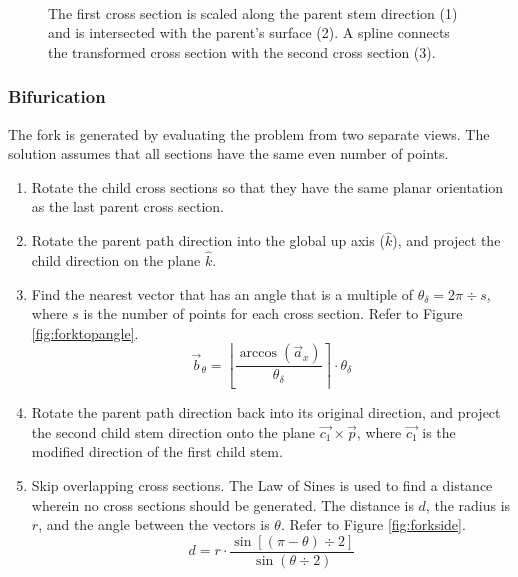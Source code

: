 \documentclass[10pt]{article}
\begin{document}
\begin{figure}[H]
\centering
 \\
\caption{The first cross section is scaled along the parent stem direction (1) and is intersected with the parent's surface (2). A spline connects the transformed cross section with the second cross section (3).}
\end{figure}

\subsubsection{Bifurication}

The fork is generated by evaluating the problem from two separate views. The solution assumes that all sections have the same even number of points.

\begin{enumerate}
\item Rotate the child cross sections so that they have the same planar orientation as the last parent cross section.
\item Rotate the parent path direction into the global up axis ($ \hat{k} $), and project the child direction on the plane $ \hat{k} $.
\item Find the nearest vector that has an angle that is a multiple of $ \theta_{\delta} = 2 \pi \div s $, where $ s $ is the number of points for each cross section. Refer to Figure \ref{fig:forktopangle}.
\[ \vec{b}_{\theta} = \left \lfloor \frac{\arccos(\vec{a}_x)}{\theta_{\delta}} \right\rceil \cdot \theta_{\delta} \]
\item Rotate the parent path direction back into its original direction, and project the second child stem direction onto the plane $ \vec{c_1} \times \vec{p} $, where $ \vec{c_1} $ is the modified direction of the first child stem.
\item Skip overlapping cross sections. The Law of Sines is used to find a distance wherein no cross sections should be generated. The distance is $ d $, the radius is $ r $, and the angle between the vectors is $ \theta $. Refer to Figure \ref{fig:forkside}.
\[ d = r \cdot \frac{\sin[(\pi-\theta)\div2]}{\sin (\theta\div2)}  \]
\end{enumerate}
\end{document}
